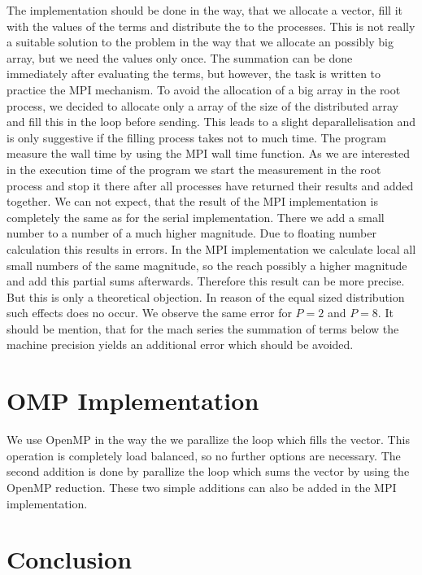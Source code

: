 The implementation should be done in the way, that we allocate a vector, fill it with the values of the terms and distribute the to the processes. This is not really a suitable solution to the problem in the way that we allocate an possibly big array, but we need the values only once. The summation can be done immediately after evaluating the terms, but however, the task is written to practice the MPI mechanism. To avoid the allocation of a big array in the root process, we decided to allocate only a array of the size of the distributed array and fill this in the loop before sending. This leads to a slight deparallelisation and is only suggestive if the filling process takes not to much time. The program measure the wall time by using the MPI wall time function. As we are interested in the execution time of the program we start the measurement in the root process and stop it there after all processes have returned their results and added together. We can not expect, that the result of the MPI implementation is completely the same as for the serial implementation. There we add a small number to a number of a much higher magnitude. Due to floating number calculation this results in errors. In the MPI implementation we calculate local all small numbers of the same magnitude, so the reach possibly a higher magnitude and add this partial sums afterwards. Therefore this result can be more precise. But this is only a theoretical objection. In reason of the equal sized distribution such effects does no occur. We observe the same error for $P=2$ and $P=8$. It should be mention, that for the mach series the summation of terms below the machine precision yields an additional error which should be avoided. 


\section{OMP Implementation}

We use OpenMP in the way the we parallize the loop which fills the vector. This operation is completely load balanced, so no further options are necessary. The second addition is done by parallize the loop which sums the vector by using the OpenMP reduction. These two simple additions can also be added in the MPI implementation. 

\section{Conclusion}


